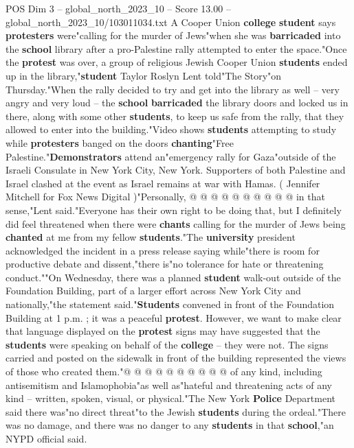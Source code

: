 \begin{textsample}{POS Dim 3 – global\_north\_2023\_10 – Score 13.00 – global\_north\_2023\_10/103011034.txt}  \label{ex:f3_pos_271}
A Cooper Union \textbf{college} \textbf{student} says \textbf{protesters} were"calling for the murder of Jews"when she was \textbf{barricaded} into the \textbf{school} library after a pro-Palestine rally attempted to enter the space."Once the \textbf{protest} was over, a group of religious Jewish Cooper Union \textbf{students} ended up in the library,"\textbf{student} Taylor Roslyn Lent told"The Story"on Thursday."When the rally decided to try and get into the library as well -- very angry and very loud -- the \textbf{school} \textbf{barricaded} the library doors and locked us in there, along with some other \textbf{students}, to keep us safe from the rally, that they allowed to enter into the building."Video shows \textbf{students} attempting to study while \textbf{protesters} banged on the doors \textbf{chanting}"Free Palestine."\textbf{Demonstrators} attend an"emergency rally for Gaza"outside of the Israeli Consulate in New York City, New York.
Supporters of both Palestine and Israel clashed at the event as Israel remains at war with Hamas. ( Jennifer Mitchell for Fox News Digital )"Personally, @ @ @ @ @ @ @ @ @ @ in that sense,"Lent said."Everyone has their own right to be doing that, but I definitely did feel threatened when there were \textbf{chants} calling for the murder of Jews being \textbf{chanted} at me from my fellow \textbf{students}."The \textbf{university} president acknowledged the incident in a press release saying while"there is room for productive debate and dissent,"there is"no tolerance for hate or threatening conduct.""On Wednesday, there was a planned \textbf{student} walk-out outside of the Foundation Building, part of a larger effort across New York City and nationally,"the statement said."\textbf{Students} convened in front of the Foundation Building at 1 p.m. ; it was a peaceful \textbf{protest}.
However, we want to make clear that language displayed on the \textbf{protest} signs may have suggested that the \textbf{students} were speaking on behalf of the \textbf{college} -- they were not.
The signs carried and posted on the sidewalk in front of the building represented the views of those who created them."@ @ @ @ @ @ @ @ @ @ of any kind, including antisemitism and Islamophobia"as well as"hateful and threatening acts of any kind -- written, spoken, visual, or physical."The New York \textbf{Police} Department said there was"no direct threat"to the Jewish \textbf{students} during the ordeal."There was no damage, and there was no danger to any \textbf{students} in that \textbf{school},"an NYPD official said.

\end{textsample}
